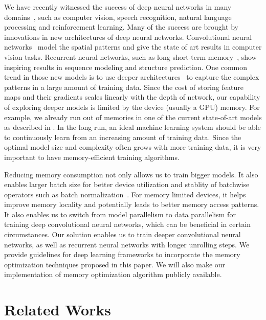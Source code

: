 \documentclass{article} %
\newcommand{\presec}{\vspace*{-2pt}}
\newcommand{\postsec}{\vspace*{-2pt}} %
\begin{document}
We have recently witnessed the success of deep neural networks in many domains~\cite
{Goodfellow-et-al-2016-Book}, such as computer vision, speech recognition, natural language
processing and reinforcement learning.
Many of the success are brought by innovations in new architectures of deep neural networks.
Convolutional neural networks~\cite{lecun-cnn,Alexnet,Ioffe+Szegedy-2015, He2015} model
the spatial patterns and give the state of art results in computer vision tasks.
Recurrent neural networks, such as long short-term memory~\cite{Hochreiter:LSTM},
show inspiring results in sequence modeling and structure prediction.
One common trend in those new models is to use deeper architectures~\cite
{srivastava2015highway,Alexnet,Ioffe+Szegedy-2015, He2015}
to capture the complex patterns in a large amount of training data.
Since the cost of storing feature maps and their gradients scales linearly with the depth of network, our capability of exploring deeper models is limited by the device (usually a GPU) memory.
For example, we already run out of memories in one of the current state-of-art models as described
in \cite{He2016}.
In the long run, an ideal machine learning system should be able to continuously learn from
an increasing amount of training data.
Since the optimal model size and complexity often grows with more training data, it is very
important to have memory-efficient training algorithms.

Reducing memory consumption not only allows us to train bigger models.
It also enables larger batch size for better device utilization and stablity of batchwise operators
such as batch normalization~\cite{Ioffe+Szegedy-2015}.
For memory limited devices, it helps improve memory locality and potentially leads to better memory
access patterns. It also enables us to switch from model parallelism to data parallelism for training
deep convolutional neural networks, which can be beneficial in certain circumstances.
Our solution enables us to train deeper convolutional neural networks, as well as
recurrent neural networks with longer unrolling steps. We provide guidelines for deep learning
frameworks to incorporate the memory optimization techniques proposed in this paper. We will also
make our implementation of memory optimization algorithm publicly available.


\presec
\section{Related Works}\label{sec:rel}
\postsec
\end{document}
